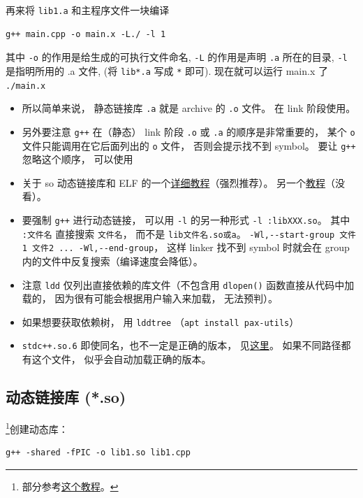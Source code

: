 再来将 \verb`lib1.a` 和主程序文件一块编译
\begin{lstlisting}[language=none]
g++ main.cpp -o main.x -L./ -l 1
\end{lstlisting}

其中 \verb`-o` 的作用是给生成的可执行文件命名, \verb`-L` 的作用是声明 \verb`.a` 所在的目录, \verb`-l` 是指明所用的 .a 文件, (将 \verb`lib*.a` 写成 \verb`*` 即可).
现在就可以运行 main.x 了
\verb`./main.x`

\begin{itemize}
\item 所以简单来说， 静态链接库 \verb`.a` 就是 archive 的 \verb`.o` 文件。 在 link 阶段使用。
\item 另外要注意 \verb`g++` 在（静态） link 阶段 \verb`.o` 或 \verb`.a` 的顺序是非常重要的， 某个 \verb`o` 文件只能调用在它后面列出的 \verb`o` 文件， 否则会提示找不到 symbol。 要让 \verb`g++` 忽略这个顺序， 可以使用
\item 关于 so 动态链接库和 ELF 的一个\href{https://amir.rachum.com/blog/2016/09/17/shared-libraries/}{详细教程}（强烈推荐）。 另一个\href{https://holtstrom.com/michael/blog/post/446/Shared-Library-Symbol-Conflicts-(on-Solaris).html}{教程}（没看）。
\item 要强制 \verb`g++` 进行动态链接， 可以用 \verb`-l` 的另一种形式 \verb`-l :libXXX.so`。 其中 \verb`:文件名` 直接搜索 \verb`文件名`， 而不是 \verb`lib文件名.so或a`。
\verb`-Wl,--start-group 文件1 文件2 ... -Wl,--end-group`， 这样 linker 找不到 symbol 时就会在 group 内的文件中反复搜索（编译速度会降低）。
\item 注意 \verb`ldd` 仅列出直接依赖的库文件（不包含用 \verb`dlopen()` 函数直接从代码中加载的， 因为很有可能会根据用户输入来加载， 无法预判）。
\item 如果想要获取依赖树， 用 \verb`lddtree` （\verb`apt install pax-utils`）
\item \verb`stdc++.so.6` 即使同名，也不一定是正确的版本， 见\href{https://unix.stackexchange.com/questions/458659/what-do-the-multiple-glibc-versions-mean-in-the-output-of-ldd}{这里}。 如果不同路径都有这个文件， 似乎会自动加载正确的版本。
\end{itemize}

\subsection{动态链接库 (*.so)}
\footnote{部分参考\href{https://amir.rachum.com/blog/2016/09/17/shared-libraries/}{这个教程}。}创建动态库：
\begin{lstlisting}[language=none]
g++ -shared -fPIC -o lib1.so lib1.cpp
\end{lstlisting}

